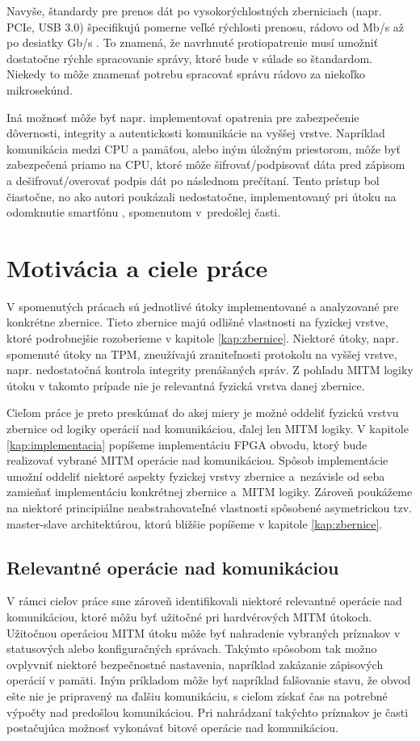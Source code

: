 Navyše, štandardy pre prenos dát po vysokorýchlostných zberniciach (napr. PCIe, USB 3.0) špecifikujú pomerne veľké rýchlosti prenosu, rádovo od Mb/s až po desiatky Gb/s \cite{i2cSpec, pcieSpec}. To znamená, že navrhnuté protiopatrenie musí umožniť dostatočne rýchle spracovanie správy, ktoré bude v súlade so štandardom. Niekedy to môže znamenať potrebu spracovať správu rádovo za niekoľko mikrosekúnd.

Iná možnosť môže byť napr. implementovať opatrenia pre zabezpečenie dôvernosti, integrity a autentickosti komunikácie na vyššej vrstve. Napríklad komunikácia medzi CPU a pamäťou, alebo iným úložným priestorom, môže byť zabezpečená priamo na CPU, ktoré môže šifrovať/podpisovať dáta pred zápisom a dešifrovať/overovať podpis dát po následnom prečítaní. Tento prístup bol čiastočne, no ako autori poukázali nedostatočne, implementovaný pri útoku na odomknutie smartfónu \cite{mitmSmartphone}, spomenutom v~predošlej časti.

\section{Motivácia a ciele práce}
V spomenutých prácach sú jednotlivé útoky implementované a analyzované pre konkrétne zbernice. Tieto zbernice majú odlišné vlastnosti na fyzickej vrstve, ktoré podrobnejšie rozoberieme v kapitole \ref{kap:zbernice}. Niektoré útoky, napr. spomenuté útoky na TPM, zneužívajú zraniteľnosti protokolu na vyššej vrstve, napr. nedostatočná kontrola integrity prenášaných správ. Z pohľadu MITM logiky útoku v takomto prípade nie je relevantná fyzická vrstva danej zbernice.

Cieľom práce je preto preskúmať do akej miery je možné oddeliť fyzickú vrstvu zbernice od logiky operácií nad komunikáciou, ďalej len MITM logiky. V kapitole \ref{kap:implementacia} popíšeme implementáciu FPGA obvodu, ktorý bude realizovať vybrané MITM operácie nad komunikáciou. Spôsob implementácie umožní oddeliť niektoré aspekty fyzickej vrstvy zbernice a~nezávisle od seba zamieňať implementáciu konkrétnej zbernice a~MITM logiky. Zároveň poukážeme na niektoré principiálne neabstrahovateľné vlastnosti spôsobené asymetrickou tzv. master-slave architektúrou, ktorú bližšie popíšeme v kapitole \ref{kap:zbernice}.

\subsection{Relevantné operácie nad komunikáciou}
V rámci cieľov práce sme zároveň identifikovali niektoré relevantné operácie nad komunikáciou, ktoré môžu byť užitočné pri hardvérových MITM útokoch. Užitočnou operáciou MITM útoku môže byť nahradenie vybraných príznakov v statusových alebo konfiguračných správach. Takýmto spôsobom tak možno ovplyvniť niektoré bezpečnostné nastavenia, napríklad zakázanie zápisových operácií v pamäti. Iným príkladom môže byť napríklad falšovanie stavu, že obvod ešte nie je pripravený na ďalšiu komunikáciu, s cieľom získať čas na potrebné výpočty nad predošlou komunikáciou. Pri nahrádzaní takýchto príznakov je časti postačujúca možnosť vykonávať bitové operácie nad komunikáciou.

